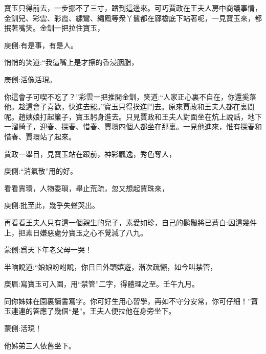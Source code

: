\begin{parag}
    寶玉只得前去，一步挪不了三寸，蹭到這邊來。可巧賈政在王夫人房中商議事情，金釧兒、彩雲、彩霞、繡鸞、繡鳳等衆丫鬟都在廊檐底下站著呢，一見寶玉來，都抿著嘴笑。金釧一把拉住寶玉，\begin{note}庚側:有是事，有是人。\end{note}悄悄的笑道:“我這嘴上是才擦的香浸胭脂，\begin{note}庚側:活像活現。\end{note}你這會子可喫不吃了？”彩雲一把推開金釧，笑道:“人家正心裏不自在，你還奚落他。趁這會子喜歡，快進去罷。”寶玉只得挨進門去。原來賈政和王夫人都在裏間呢。趙姨娘打起簾子，寶玉躬身進去。只見賈政和王夫人對面坐在炕上說話，地下一溜椅子，迎春、探春、惜春、賈環四個人都坐在那裏。一見他進來，惟有探春和惜春、賈環站了起來。
\end{parag}


\begin{parag}
    賈政一舉目，見寶玉站在跟前，神彩飄逸，秀色奪人，\begin{note}庚側:“消氣散”用的好。\end{note}看看賈環，人物委瑣，舉止荒疏，忽又想起賈珠來，\begin{note}庚側:批至此，幾乎失聲哭出。\end{note}再看看王夫人只有這一個親生的兒子，素愛如珍，自己的鬍鬚將已蒼白:因這幾件上，把素日嫌惡處分寶玉之心不覺減了八九。\begin{note}蒙側:爲天下年老父母一哭！\end{note}半晌說道:“娘娘吩咐說，你日日外頭嬉遊，漸次疏懶，如今叫禁管，\begin{note}庚眉:寫寶玉可入園，用“禁管”二字，得體理之至。壬午九月。\end{note}同你姊妹在園裏讀書寫字。你可好生用心習學，再如不守分安常，你可仔細！”寶玉連連的答應了幾個“是”。王夫人便拉他在身旁坐下。\begin{note}蒙側:活現！\end{note}他姊弟三人依舊坐下。
\end{parag}


